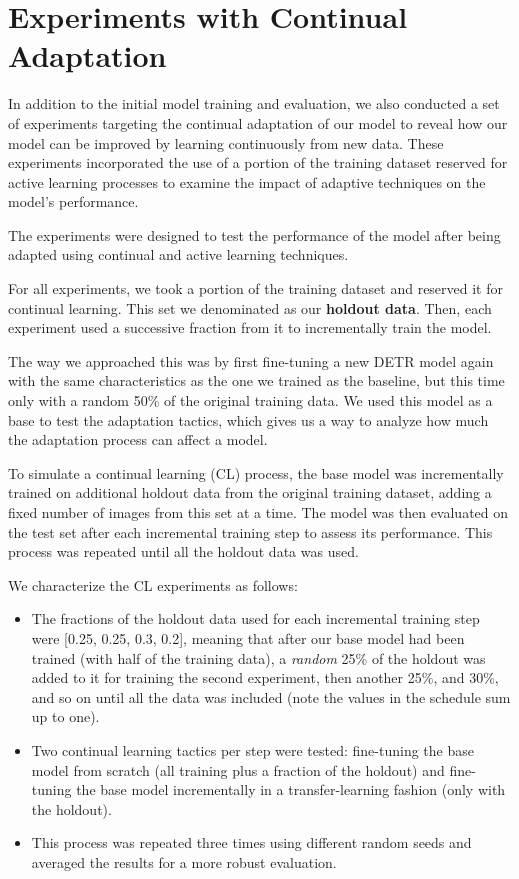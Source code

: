 \documentclass[../main.tex]{subfiles}
\begin{document}
    \vspace{-0.5cm}
    \section{Experiments with Continual Adaptation} \label{sec:adaptive_experiments}
    \vspace{-0.2cm}

    In addition to the initial model training and evaluation, we also conducted a set of experiments targeting the continual adaptation of our model to reveal how our model can be improved by learning continuously from new data. These experiments incorporated the use of a portion of the training dataset reserved for active learning processes to examine the impact of adaptive techniques on the model's performance.

    The experiments were designed to test the performance of the model after being adapted using continual and active learning techniques.
    
    For all experiments, we took a portion of the training dataset and reserved it for continual learning. This set we denominated as our \textbf{holdout data}. Then, each experiment used a successive fraction from it to incrementally train the model. 
    
    The way we approached this was by first fine-tuning a new DETR model again with the same characteristics as the one we trained as the baseline, but this time only with a random 50\% of the original training data. We used this model as a base to test the adaptation tactics, which gives us a way to analyze how much the adaptation process can affect a model.

    To simulate a continual learning (CL) process, the base model was incrementally trained on additional holdout data from the original training dataset, adding a fixed number of images from this set at a time. The model was then evaluated on the test set after each incremental training step to assess its performance. This process was repeated until all the holdout data was used.

    We characterize the CL experiments as follows:

    \begin{itemize}
        \item The fractions of the holdout data used for each incremental training step were [0.25, 0.25, 0.3, 0.2], meaning that after our base model had been trained (with half of the training data), a \textit{random} 25\% of the holdout was added to it for training the second experiment, then another 25\%, and 30\%, and so on until all the data was included (note the values in the schedule sum up to one).
        \item Two continual learning tactics per step were tested: fine-tuning the base model from scratch (all training plus a fraction of the holdout) and fine-tuning the base model incrementally in a transfer-learning fashion (only with the holdout).
        \item This process was repeated three times using different random seeds and averaged the results for a more robust evaluation.
    \end{itemize}
\end{document}
